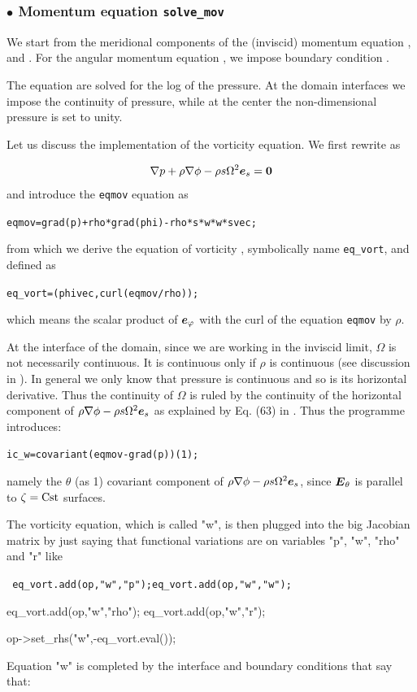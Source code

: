\subsubsection{$\bullet$ \bf Momentum equation {\tt solve\_mov}}

We start from the meridional components of the (inviscid) momentum equation
,  and . For the angular momentum
equation , we impose boundary condition .

The equation are solved for the log of the pressure. At the domain
interfaces we impose the continuity of pressure, while at the center the
non-dimensional pressure is set to unity.

Let us discuss the implementation of the vorticity equation. We first rewrite  as 

\[ \na p +\rho\na\phi -\rho s\Omega^2\es=\vzero\]
and introduce the {\tt eqmov} equation as

\bigskip
\centerline{\tt eqmov=grad(p)+rho*grad(phi)-rho*s*w*w*svec;}
\bigskip
\noindent from which we derive the equation of vorticity , symbolically name {\tt eq\_vort},
and defined as

\centerline{\tt eq\_vort=(phivec,curl(eqmov/rho));}
\bigskip
\noindent which means the scalar product of $\ephi$ with the curl of
the equation {\tt eqmov} by $\rho$.

At the interface of the domain, since we are working in the inviscid
limit, $\Omega$ is not necessarily continuous. It is continuous only if
$\rho$ is continuous (see discussion in \citealt{ELR13}). In general we
only know that pressure is continuous and so is its horizontal
derivative. Thus the continuity of $\Omega$ is ruled by the continuity
of the horizontal component of $\rho\na\phi-\rho s\Omega^2\es$ as
explained by Eq. (63) in \cite{ELR13}. Thus the programme introduces:

\bigskip
\centerline{\tt ic\_w=covariant(eqmov-grad(p))(1);}
\bigskip
\noindent namely the $\theta$ (as 1) covariant component of $\rho\na\phi-\rho s\Omega^2\es$,
since $\vE_\theta$ is parallel to $\zeta={\rm Cst}$ surfaces.
\bigskip

The vorticity equation, which is called "w", is then plugged into the
big Jacobian matrix by just saying that  functional variations are on
variables "p", "w", "rho" and "r" like

\begin{center}
{\tt
        eq\_vort.add(op,"w","p");\qquad eq\_vort.add(op,"w","w"); \par
        eq\_vort.add(op,"w","rho"); \qquad eq\_vort.add(op,"w","r"); \par
        op->set\_rhs("w",-eq\_vort.eval()); \par
}
\end{center}
Equation "w" is completed by the interface and boundary conditions that
say that:

